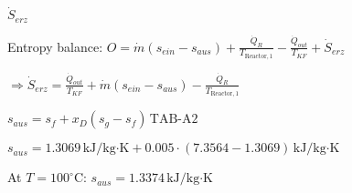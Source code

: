 \( \dot{S}_{erz} \)  

Entropy balance:  
\( O = \dot{m} (s_{ein} - s_{aus}) + \frac{\dot{Q}_R}{T_{\text{Reactor},1}} - \frac{\dot{Q}_{out}}{T_{KF}} + \dot{S}_{erz} \)  

\( \Rightarrow \dot{S}_{erz} = \frac{\dot{Q}_{out}}{T_{KF}} + \dot{m} (s_{ein} - s_{aus}) - \frac{\dot{Q}_R}{T_{\text{Reactor},1}} \)  

\( s_{aus} = s_f + x_D (s_g - s_f) \, \text{TAB-A2} \)  

\( s_{aus} = 1.3069 \, \text{kJ/kg·K} + 0.005 \cdot (7.3564 - 1.3069) \, \text{kJ/kg·K} \)  

At \( T = 100^\circ \text{C} \):  
\( s_{aus} = 1.3374 \, \text{kJ/kg·K} \)